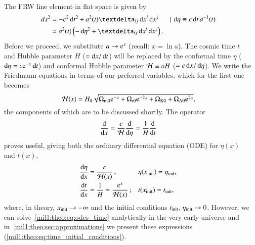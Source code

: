 


The FRW line element in flat space is given by
\begin{equation}\label{mil1:theo:eq:FRW}
    \begin{split}
        d s^2 &= -c^2\diff t^2 + a^2(t) \deltasym{ij} \diff x^i \diff x^j && |\, \diff \eta \equiv c\diff t\, a^{-1}(t) \\%
                &= a^2(t) \left( -\diff \eta^2 + \deltasym{ij} \diff x^i \diff x^j \right).
    \end{split}
\end{equation}
Before we proceed, we substitute $a\to \eu^x$ (recall: $x=\ln{a}$). The cosmic time $t$ and Hubble parameter $H$ ($=\mathop{}\!\mathrm{d} x/\mathop{}\!\mathrm{d} t$) will be replaced by the conformal time $\eta$ ($\diff \eta = c\eu^{-x}\diff t$) and conformal Hubble parameter $\mathcal{H}\equiv aH$ ($=c\mathop{}\!\mathrm{d} x/\mathop{}\!\mathrm{d} \eta$). We write the Friedmann equations in terms of our preferred variables, which for the first one becomes
\begin{equation}\label{mil1:theo:eq:Hp_of_x}
    \Hp(x) = H_0 \sqrt{\OmgM \eu^{-x} + \OmgR \eu^{-2x}  + \OmgK + \OmgL \eu^{2x}},
\end{equation}
the components of which are to be discussed shortly. The operator 
\begin{equation}
    \dv{}{x} = \frac{c}{\mathcal{H}} \dv{}{\eta} = \frac{1}{H} \dv{}{t}
\end{equation}
proves useful, giving both the ordinary differential equation (ODE) for $\eta(x)$ and $t(x)$,
\begin{subequations}\label{mil1:theo:eq:odes_time}
    \begin{align}
        \dv{\eta}{x} &= \frac{c}{\Hp(x)}\,; &&  \eta(x\ped{init}) = \eta\ped{init} ,\label{mi1:theo:eq:ode_eta_of_x}\\
        \dv{t}{x} &= \frac{1}{H} = \frac{\eu^x}{\Hp(x)}\,; && t(x\ped{init}) = t\ped{init},\label{mi1:theo:eq:ode_t_of_x}
    \end{align}
\end{subequations}
where, in theory, $x_\mathrm{init}\to -\infty$ and the initial conditions $t_\mathrm{init},\, \eta_\mathrm{init} \to 0$. However, we can solve~\cref{mil1:theo:eq:odes_time} analytically in the very early universe and in~\cref{mil1:theo:sec:approximations} we present these expressions (\cref{mil1:theo:eq:time_initial_conditions}). 

